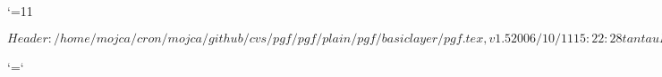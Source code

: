 %
%
%


\edef\pgfatcode{\the\catcode`\@}
\catcode`\@=11



\ProvidesPackageRCS $Header: /home/mojca/cron/mojca/github/cvs/pgf/pgf/plain/pgf/basiclayer/pgf.tex,v 1.5 2006/10/11 15:22:28 tantau Exp $









\catcode`\@=\pgfatcode

\endinput
